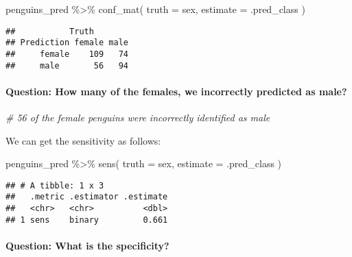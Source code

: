\documentclass[
]{article}
\newenvironment{Shaded}{\begin{snugshade}}{\end{snugshade}}
\newcommand{\AttributeTok}[1]{\textcolor[rgb]{0.77,0.63,0.00}{#1}}
\newcommand{\CommentTok}[1]{\textcolor[rgb]{0.56,0.35,0.01}{\textit{#1}}}
\newcommand{\FunctionTok}[1]{\textcolor[rgb]{0.00,0.00,0.00}{#1}}
\newcommand{\NormalTok}[1]{#1}
\newcommand{\SpecialCharTok}[1]{\textcolor[rgb]{0.00,0.00,0.00}{#1}}
\begin{document}
\begin{Shaded}
\begin{Highlighting}[]
\NormalTok{penguins\_pred }\SpecialCharTok{\%\textgreater{}\%} \FunctionTok{conf\_mat}\NormalTok{( }\AttributeTok{truth =}\NormalTok{ sex, }\AttributeTok{estimate =}\NormalTok{ .pred\_class )}
\end{Highlighting}
\end{Shaded}

\begin{verbatim}
##           Truth
## Prediction female male
##     female    109   74
##     male       56   94
\end{verbatim}

\hypertarget{question-how-many-of-the-females-we-incorrectly-predicted-as-male}{%
\paragraph{Question: How many of the females, we incorrectly predicted
as
male?}\label{question-how-many-of-the-females-we-incorrectly-predicted-as-male}}

\begin{Shaded}
\begin{Highlighting}[]
\CommentTok{\# 56 of the female penguins were incorrectly identified as male}
\end{Highlighting}
\end{Shaded}

We can get the sensitivity as follows:

\begin{Shaded}
\begin{Highlighting}[]
\NormalTok{penguins\_pred }\SpecialCharTok{\%\textgreater{}\%} \FunctionTok{sens}\NormalTok{( }\AttributeTok{truth =}\NormalTok{ sex, }\AttributeTok{estimate =}\NormalTok{ .pred\_class )}
\end{Highlighting}
\end{Shaded}

\begin{verbatim}
## # A tibble: 1 x 3
##   .metric .estimator .estimate
##   <chr>   <chr>          <dbl>
## 1 sens    binary         0.661
\end{verbatim}

\hypertarget{question-what-is-the-specificity}{%
\paragraph{Question: What is the
specificity?}\label{question-what-is-the-specificity}}
\end{document}
